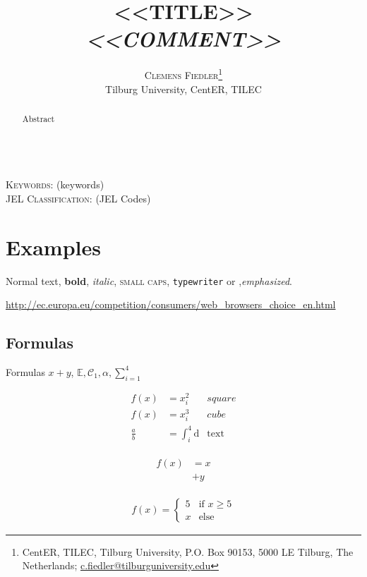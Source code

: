 \documentclass[a4paper, 11pt]{article}
\author{\textsc{Clemens Fiedler}\thanks{CentER, TILEC, Tilburg University, P.O. Box 90153, 5000 LE Tilburg, The Netherlands; \href{mailto:c.fiedler@tilburguniversity.edu}{c.fiedler@tilburguniversity.edu}}\\
	Tilburg University, CentER, TILEC}
\title{\textsc{<<TITLE>>}\\
	\textit{\large <<COMMENT>>}}
\renewcommand{\d}{\text{d}}
\begin{document}
	\maketitle

	\begin{abstract}
		Abstract
	\end{abstract}

	\hspace{4cm}\\
	\noindent\textsc{Keywords:} (keywords)\\
	\noindent\textsc{JEL Classification:} (JEL Codes)

	\newpage


	\section{Examples}\label{sec:examples}

		Normal text, \textbf{bold}, \textit{italic}, \textsc{small caps}, \texttt{typewriter} or ,\emph{emphasized}. 

		\url{http://ec.europa.eu/competition/consumers/web_browsers_choice_en.html}

		\subsection{Formulas}
		Formulas $x+y$, $\mathbb{E}, \mathcal{C}_1, \alpha, \sum_{i=1}^{4}$

\begin{align}
f(x)&=x_i^2 &square\\
f(x)&=x_i^3 &cube\\
\frac{a}{b}&=\int_{i}^{4} \d &\text{text}\nonumber
\end{align}

\begin{align}
	\begin{split}
	f(x)&=x\\
	&+y
	\end{split}
\end{align}

\begin{align}
	f(x)=
	\begin{cases}
	5& \text{if } x \geq 5\\
	x& \text{else}
	\end{cases}
\end{align}
\end{document}
